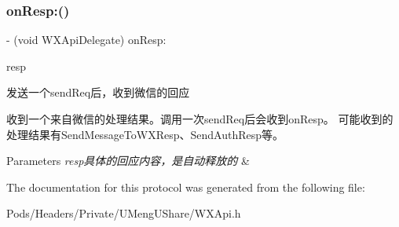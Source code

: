 \subsubsection{\texorpdfstring{on\+Resp\+:()}{onResp:()}\hspace{0.1cm}{\footnotesize\ttfamily [3/3]}}
{\footnotesize\ttfamily -\/ (void W\+X\+Api\+Delegate) on\+Resp\+: \begin{DoxyParamCaption}\item[{(\mbox{\hyperlink{interface_base_resp}{Base\+Resp}} $\ast$)}]{resp }\end{DoxyParamCaption}\hspace{0.3cm}{\ttfamily [optional]}}



发送一个send\+Req后，收到微信的回应 

收到一个来自微信的处理结果。调用一次send\+Req后会收到on\+Resp。 可能收到的处理结果有\+Send\+Message\+To\+W\+X\+Resp、\+Send\+Auth\+Resp等。 
\begin{DoxyParams}{Parameters}
{\em resp具体的回应内容，是自动释放的} & \\
\hline
\end{DoxyParams}


The documentation for this protocol was generated from the following file\+:\begin{DoxyCompactItemize}
\item 
Pods/\+Headers/\+Private/\+U\+Meng\+U\+Share/W\+X\+Api.\+h\end{DoxyCompactItemize}
